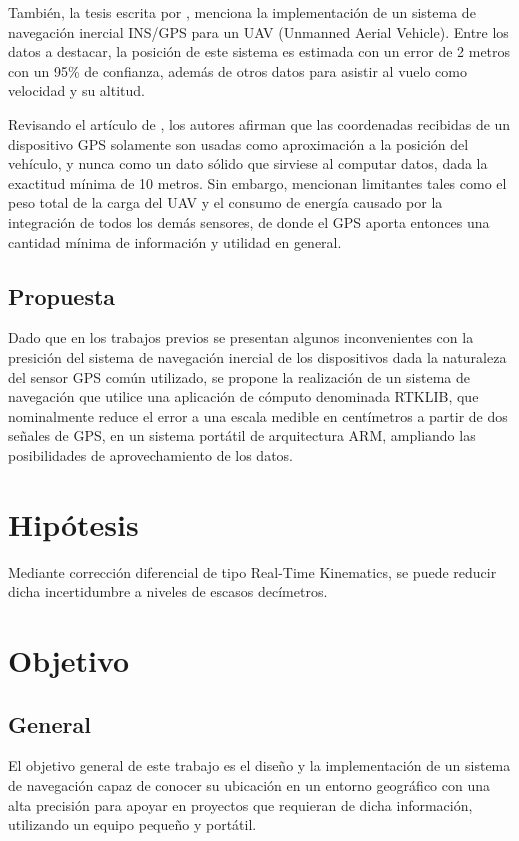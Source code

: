 
También, la tesis escrita por \cite{ronnback2000developement}, menciona la implementación de un sistema de navegación inercial INS/GPS para un UAV (Unmanned Aerial Vehicle\footnotemark). Entre los datos a destacar, la posición de este sistema es estimada con un error de 2 metros con un 95\% de confianza, además de otros datos para asistir al vuelo como velocidad y su altitud. \\


Revisando el artículo de \cite{maldonado2010controlador}, los autores afirman que las coordenadas recibidas de un dispositivo GPS solamente son usadas como aproximación a la posición del vehículo, y nunca como un dato sólido que sirviese al computar datos, dada la exactitud mínima de 10 metros. Sin embargo, mencionan limitantes tales como el peso total de la carga del UAV y el consumo de energía causado por la integración de todos los demás sensores, de donde el GPS aporta entonces una cantidad mínima de información y utilidad en general. \\


\subsection{Propuesta}
Dado que en los trabajos previos se presentan algunos inconvenientes con la presición del sistema de navegación inercial de los dispositivos dada la naturaleza del sensor GPS común utilizado, se propone la realización de un sistema de navegación que utilice una aplicación de cómputo denominada RTKLIB, que nominalmente reduce el error a una escala medible en centímetros a partir de dos señales de GPS, en un sistema portátil de arquitectura ARM, ampliando las posibilidades de aprovechamiento de los datos.

\section{Hipótesis}
Mediante corrección diferencial de tipo Real-Time Kinematics, se puede reducir dicha incertidumbre a niveles de escasos decímetros.

\section{Objetivo}
\subsection{General}
El objetivo general de este trabajo es el diseño y la implementación de un sistema de navegación capaz de conocer su ubicación en un entorno geográfico con una alta precisión para apoyar en proyectos que requieran de dicha información, utilizando un equipo pequeño y portátil.

